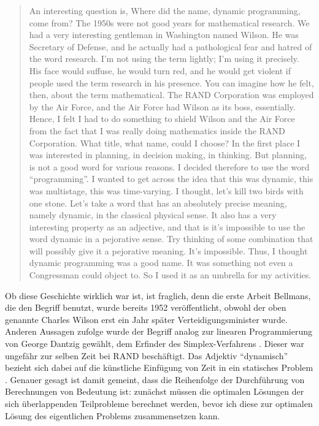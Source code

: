\begin{quotation}
	An interesting question is, Where did the name, dynamic programming, come from? The 1950s were not good years for mathematical research. We had a very interesting gentleman in Washington named Wilson. He was Secretary of Defense, and he actually had a pathological fear and hatred of the word research. I’m not using the term lightly; I’m using it precisely. His face would suffuse, he would turn red, and he would get violent if people used the term research in his presence. You can imagine how he felt, then, about the term mathematical. The RAND Corporation was employed by the Air Force, and the Air Force had Wilson as its boss, essentially. Hence, I felt I had to do something to shield Wilson and the Air Force from the fact that I was really doing mathematics inside the RAND Corporation. What title, what name, could I choose? In the first place I was interested in planning, in decision making, in thinking. But planning, is not a good word for various reasons. I decided therefore to use the word “programming”. I wanted to get across the idea that this was dynamic, this was multistage, this was time-varying. I thought, let's kill two birds with one stone. Let's take a word that has an absolutely precise meaning, namely dynamic, in the classical physical sense. It also has a very interesting property as an adjective, and that is it's impossible to use the word dynamic in a pejorative sense. Try thinking of some combination that will possibly give it a pejorative meaning. It's impossible. Thus, I thought dynamic programming was a good name. It was something not even a Congressman could object to. So I used it as an umbrella for my activities.
\end{quotation}

Ob diese Geschichte wirklich war ist, ist fraglich, denn die erste Arbeit Bellmans, die den Begriff benutzt, wurde bereits 1952 veröffentlicht, obwohl der oben genannte Charles Wilson erst ein Jahr später Verteidigungsminister wurde. Anderen Aussagen zufolge wurde der Begriff analog zur linearen Programmierung von George Dantzig gewählt, dem Erfinder des Simplex-Verfahrens \cite{rn09}. Dieser war ungefähr zur selben Zeit bei RAND beschäftigt. Das Adjektiv \enquote{dynamisch} bezieht sich dabei auf die künstliche Einfügung von Zeit in ein statisches Problem \cite{b57}. Genauer gesagt ist damit gemeint, dass die Reihenfolge der Durchführung von Berechnungen von Bedeutung ist: zunächst müssen die optimalen Lösungen der sich überlappenden Teilprobleme berechnet werden, bevor ich diese zur optimalen Lösung des eigentlichen Problems zusammensetzen kann.

